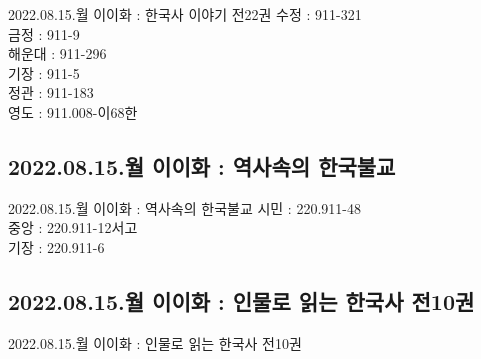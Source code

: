 \documentclass[aspectratio=1610,17pt,xcolor=pdftex,dvipsnames,table,handout]{beamer}
\begin{document}
		\begin{frame} [t,plain]
			\begin{block} {2022.08.15.월  이이화 : 한국사 이야기 전22권 }
수정		:	911-321	\\
금정		:	911-9	\\
해운대	:	911-296	\\
기장		:	911-5	\\
정관		:	911-183	\\
영도		:	911.008-이68한	\\

			\end{block}
		\end{frame}

		\subsection{2022.08.15.월  이이화 : 역사속의 한국불교 }
		
		\begin{frame} [t,plain]
			\begin{block} {2022.08.15.월  이이화 : 역사속의 한국불교 }
시민	:	220.911-48	\\
중앙	:	220.911-12서고	\\
기장	:	220.911-6	\\

			\end{block}
		\end{frame}


		\subsection{2022.08.15.월  이이화 : 인물로 읽는 한국사 전10권}
		
		\begin{frame} [t,plain]
			\begin{block} {2022.08.15.월  이이화 : 인물로 읽는 한국사 전10권}

			\end{block}
		\end{frame}

\end{document}
